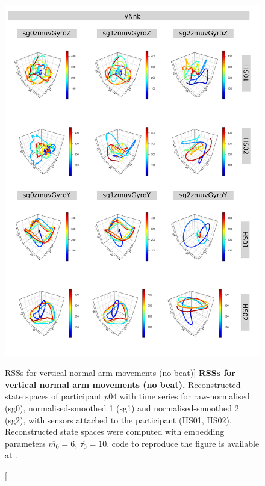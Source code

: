 

\begin{figure}
\centering
\includegraphics[height=0.8\textheight]{rss_VNnb_p04}
\caption
	[RSSs for vertical normal arm movements (no beat)]{
	{\bf RSSs for vertical normal arm movements (no beat).}
	Reconstructed state spaces of participant $p04$
	with time series for raw-normalised (sg0), 
	normalised-smoothed 1 (sg1) and 
	normalised-smoothed 2 (sg2), 
	with sensors attached to the participant (HS01, HS02).
	Reconstructed state spaces were computed with 
	embedding parameters $\overline{m_0}=6$, $\overline{\tau_0}=10$.
		\R code to reproduce the figure is available at 
		.
        }
     \label{fig:rss_VNnb_p04}
\end{figure}



